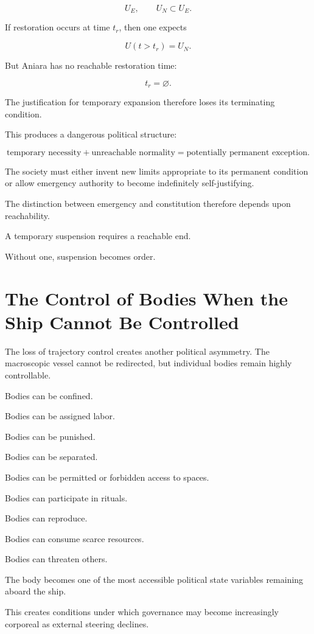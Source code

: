 \documentclass[11pt,oneside]{book}
\theoremstyle{definition}
\theoremstyle{remark}
\begin{document}
\[
U_E,
\qquad
U_N\subset U_E.
\]

If restoration occurs at time \(t_r\), then one expects

\[
U(t>t_r)=U_N.
\]

But Aniara has no reachable restoration time:

\[
t_r=\varnothing.
\]

The justification for temporary expansion therefore loses its terminating condition.

This produces a dangerous political structure:

\[
\text{temporary necessity}
+
\text{unreachable normality}
=
\text{potentially permanent exception}.
\]

The society must either invent new limits appropriate to its permanent condition or allow emergency authority to become indefinitely self-justifying.

The distinction between emergency and constitution therefore depends upon reachability.

A temporary suspension requires a reachable end.

Without one, suspension becomes order.

\section{The Control of Bodies When the Ship Cannot Be Controlled}

The loss of trajectory control creates another political asymmetry. The macroscopic vessel cannot be redirected, but individual bodies remain highly controllable.

Bodies can be confined.

Bodies can be assigned labor.

Bodies can be punished.

Bodies can be separated.

Bodies can be permitted or forbidden access to spaces.

Bodies can participate in rituals.

Bodies can reproduce.

Bodies can consume scarce resources.

Bodies can threaten others.

The body becomes one of the most accessible political state variables remaining aboard the ship.

This creates conditions under which governance may become increasingly corporeal as external steering declines.
\end{document}
